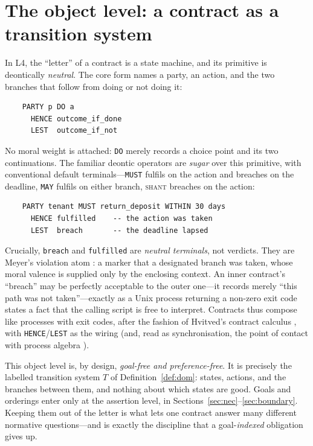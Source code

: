 
\section{The object level: a contract as a transition system}
\label{sec:object}

In L4, the ``letter'' of a contract is a state machine, and its primitive is deontically
\emph{neutral}. The core form names a party, an action, and the two branches that follow
from doing or not doing it:
\begin{verbatim}
    PARTY p DO a
      HENCE outcome_if_done
      LEST  outcome_if_not
\end{verbatim}
No moral weight is attached: \texttt{DO} merely records a choice point and its two
continuations. The familiar deontic operators are \emph{sugar} over this primitive, with
conventional default terminals---\texttt{MUST} fulfils on the action and breaches on the
deadline, \texttt{MAY} fulfils on either branch, \textsc{shant} breaches on the action:
\begin{verbatim}
    PARTY tenant MUST return_deposit WITHIN 30 days
      HENCE fulfilled    -- the action was taken
      LEST  breach       -- the deadline lapsed
\end{verbatim}
Crucially, \texttt{breach} and \texttt{fulfilled} are \emph{neutral terminals}, not
verdicts. They are Meyer's violation atom : a marker that a designated
branch was taken, whose moral valence is supplied only by the enclosing context. An inner
contract's ``breach'' may be perfectly acceptable to the outer one---it records merely
``this path was not taken''---exactly as a Unix process returning a non-zero exit code
states a fact that the calling script is free to interpret. Contracts thus compose like
processes with exit codes, after the fashion of Hvitved's contract calculus
, with \texttt{HENCE}/\texttt{LEST} as the wiring (and, read as
synchronisation, the point of contact with process algebra ).

This object level is, by design, \emph{goal-free and preference-free}. It is precisely the
labelled transition system $T$ of Definition~\ref{def:dom}: states, actions, and the
branches between them, and nothing about which states are good. Goals and orderings enter
only at the assertion level, in Sections~\ref{sec:nec}--\ref{sec:boundary}. Keeping them
out of the letter is what lets one contract answer many different normative questions---and
is exactly the discipline that a goal-\emph{indexed} obligation gives up.

